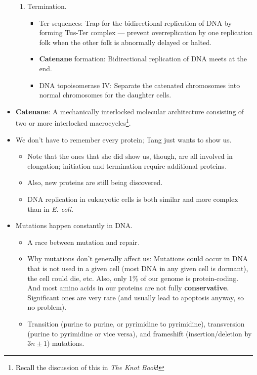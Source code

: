 \documentclass[../notes.tex]{subfiles}
\begin{document}
\begin{itemize}
\begin{enumerate}
        \item Termination.
        \begin{itemize}
            \item Ter sequences: Trap for the bidirectional replication of DNA by forming Tus-Ter complex --- prevent overreplication by one replication folk when the other folk is abnormally delayed or halted.
            \item \textbf{Catenane} formation: Bidirectional replication of DNA meets at the end.
            \item DNA topoisomerase IV: Separate the catenated chromosomes into normal chromosomes for the daughter cells.
        \end{itemize}
    \end{enumerate}
    \item \textbf{Catenane}: A mechanically interlocked molecular architecture consisting of two or more interlocked macrocycles\footnote{Recall the discussion of this in \emph{The Knot Book}!}.
    \item We don't have to remember every protein; Tang just wants to show us.
    \begin{itemize}
        \item Note that the ones that she did show us, though, are all involved in elongation; initiation and termination require additional proteins.
        \item Also, new proteins are still being discovered.
        \item DNA replication in eukaryotic cells is both similar and more complex than in \emph{E. coli}.
    \end{itemize}
    \item Mutations happen constantly in DNA.
    \begin{itemize}
        \item A race between mutation and repair.
        \item Why mutations don't generally affect us: Mutations could occur in DNA that is not used in a given cell (most DNA in any given cell is dormant), the cell could die, etc. Also, only 1\% of our genome is protein-coding. And most amino acids in our proteins are not fully \textbf{conservative}. Significant ones are very rare (and usually lead to apoptosis anyway, so no problem).
        \item Transition (purine to purine, or pyrimidine to pyrimidine), transversion (purine to pyrimidine or vice versa), and frameshift (insertion/deletion by $3n\pm 1$) mutations.

\end{itemize}
\end{itemize}
\end{document}
